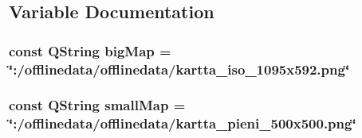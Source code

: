 \subsection{Variable Documentation}
\hypertarget{gameengine_8hh_ad6494001dd20d6bedc7543fec6c695ba}{
\subsubsection[{big\-Map}]{\setlength{\rightskip}{0pt plus 5cm}const Q\-String big\-Map = \char`\"{}\-:/offlinedata/offlinedata/kartta\-\_\-iso\-\_\-1095x592.\-png\char`\"{}}}\label{gameengine_8hh_ad6494001dd20d6bedc7543fec6c695ba}
\hypertarget{gameengine_8hh_af60fadacdd8d88e839ee0eae05d28518}{
\subsubsection[{small\-Map}]{\setlength{\rightskip}{0pt plus 5cm}const Q\-String small\-Map = \char`\"{}\-:/offlinedata/offlinedata/kartta\-\_\-pieni\-\_\-500x500.\-png\char`\"{}}}\label{gameengine_8hh_af60fadacdd8d88e839ee0eae05d28518}
